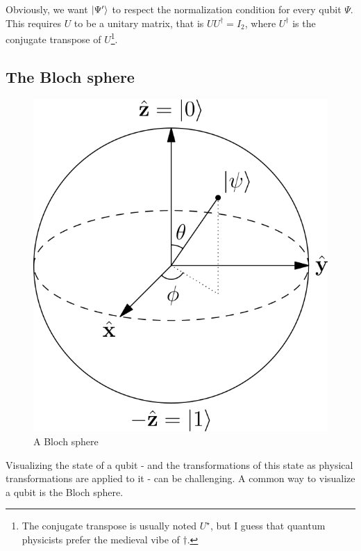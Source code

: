 \documentclass[12pt,a4paper]{article}
\theoremstyle{plain}
\theoremstyle{definition}
\DeclarePairedDelimiter\ket{\lvert}{\rangle}
\begin{document}
Obviously, we want $\ket{\Psi'}$ to respect the normalization condition for every qubit $\Psi$. This requires $U$ to be a unitary matrix, that is $UU^\dagger = I_2$, where $U^\dagger$ is the conjugate transpose of $U$\footnote{The conjugate transpose is usually noted $U^\star$, but I guess that quantum physicists prefer the medieval vibe of $\dagger$.}.

\subsection{The Bloch sphere}

\begin{figure}
    \centering
    \includegraphics*{bloch-sphere}
    \caption{A Bloch sphere}
\end{figure}

Visualizing the state of a qubit - and the transformations of this state as physical transformations are applied to it - can be challenging. A common way to visualize a qubit is the Bloch sphere.
\end{document}

